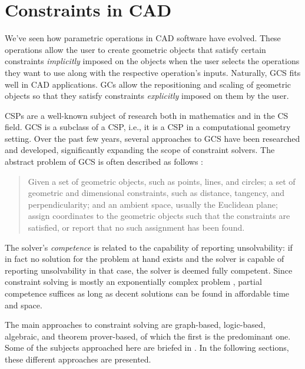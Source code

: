 \section{Constraints in \acs{CAD}}
\label{sec:intro.constraints}

We've seen how parametric operations in \ac{CAD} software have evolved.  These
operations allow the user to create geometric objects that satisfy certain
constraints \textit{implicitly} imposed on the objects when the user selects the
operations they want to use along with the respective operation's inputs.
Naturally, \ac{GCS} fits well in \ac{CAD} applications.  \Acp{GC} allow the
repositioning and scaling of geometric objects so that they satisfy constraints
\textit{explicitly} imposed on them by the user.

\acp{CSP} are a well-known subject of research both in mathematics and in the
\ac{CS} field.  \ac{GCS} is a subclass of a \ac{CSP}, i.e., it is a \ac{CSP} in
a computational geometry setting. Over the past few years, several approaches to
\ac{GCS} have been researched and developed, significantly expanding the scope
of constraint solvers. The abstract problem of \ac{GCS} is often described as
follows \cite{Bettig:2011:GCSPC:1.3593408}:
%
\begin{quote}
  Given a set of geometric objects, such as points, lines, and circles; a set of
  geometric and dimensional constraints, such as distance, tangency, and
  perpendicularity; and an ambient space, usually the Euclidean plane; assign
  coordinates to the geometric objects such that the constraints are satisfied,
  or report that no such assignment has been found.
\end{quote}
%
The solver's \textit{competence} is related to the capability of reporting
unsolvability: if in fact no solution for the problem at hand exists and the
solver is capable of reporting unsolvability in that case, the solver is deemed
fully competent.  Since constraint solving is mostly an exponentially complex
problem \cite{Rossi:2006:Handbook}, partial competence suffices as long as
decent solutions can be found in affordable time and space.

The main approaches to constraint solving are graph-based, logic-based,
algebraic, and theorem prover-based, of which the first is the predominant one.
Some of the subjects approached here are briefed in \cite{Hoffmann:2005:BCS}.
In the following sections, these different approaches are presented.


